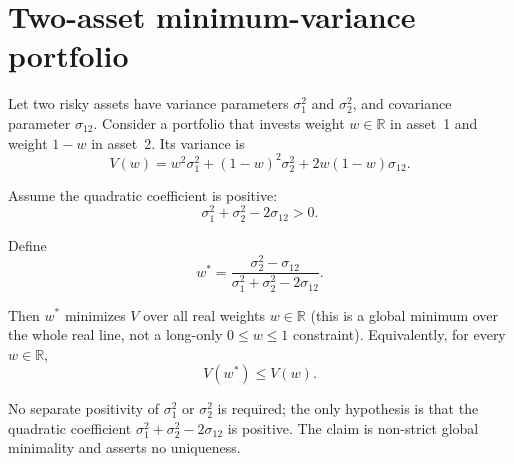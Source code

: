 \documentclass{article}
\begin{document}
\section*{Two-asset minimum-variance portfolio}

Let two risky assets have variance parameters \(\sigma_1^2\) and \(\sigma_2^2\), and covariance
parameter \(\sigma_{12}\). Consider a portfolio that invests weight \(w \in \mathbb{R}\) in
asset~1 and weight \(1-w\) in asset~2. Its variance is
\[
V(w)
=
w^2 \sigma_1^2
+
(1-w)^2 \sigma_2^2
+
2 w (1-w) \sigma_{12}.
\]

Assume the quadratic coefficient is positive:
\[
\sigma_1^2 + \sigma_2^2 - 2\sigma_{12} > 0.
\]

Define
\[
w^\ast
=
\frac{\sigma_2^2 - \sigma_{12}}
{\sigma_1^2 + \sigma_2^2 - 2\sigma_{12}}.
\]

Then \(w^\ast\) minimizes \(V\) over all real weights \(w \in \mathbb{R}\) (this is a global
minimum over the whole real line, not a long-only \(0 \le w \le 1\) constraint). Equivalently,
for every \(w \in \mathbb{R}\),
\[
V(w^\ast) \leq V(w).
\]

No separate positivity of \(\sigma_1^2\) or \(\sigma_2^2\) is required; the only hypothesis is
that the quadratic coefficient \(\sigma_1^2 + \sigma_2^2 - 2\sigma_{12}\) is positive. The claim
is non-strict global minimality and asserts no uniqueness.
\end{document}
